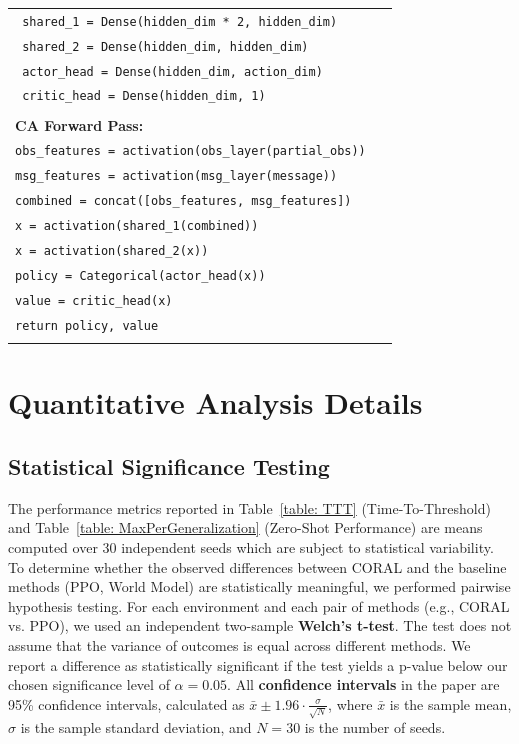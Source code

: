 \documentclass[letterpaper]{article}
\begin{document}
\begin{appendix}
\begin{table}[!htbp]
\begin{tabular}{@{}p{0.95\linewidth}@{}}
\texttt{  shared\_1 = Dense(hidden\_dim * 2, hidden\_dim)} \\
\texttt{  shared\_2 = Dense(hidden\_dim, hidden\_dim)} \\
\texttt{  actor\_head = Dense(hidden\_dim, action\_dim)} \\
\texttt{  critic\_head = Dense(hidden\_dim, 1)} \\
\\
\textbf{CA Forward Pass:} \\
\texttt{obs\_features = activation(obs\_layer(partial\_obs))} \\
\texttt{msg\_features = activation(msg\_layer(message))} \\
\texttt{combined = concat([obs\_features, msg\_features])} \\
\texttt{x = activation(shared\_1(combined))} \\
\texttt{x = activation(shared\_2(x))} \\
\texttt{policy = Categorical(actor\_head(x))} \\
\texttt{value = critic\_head(x)} \\
\texttt{return policy, value} \\
\\
\bottomrule[\heavyrulewidth]
\end{tabular}
\end{table}
\section{Quantitative Analysis Details}
\subsection{Statistical Significance Testing}
\label{subsec:welch_t_test}
The performance metrics reported in Table~\ref{table: TTT} (Time-To-Threshold) and Table~\ref{table: MaxPerGeneralization} (Zero-Shot Performance) are means computed over 30 independent seeds which are subject to statistical variability. To determine whether the observed differences between CORAL and the baseline methods (PPO, World Model) are statistically meaningful, we performed pairwise hypothesis testing. For each environment and each pair of methods (e.g., CORAL vs. PPO), we used an independent two-sample \textbf{Welch's t-test}. The test does not assume that the variance of outcomes is equal across different methods. We report a difference as statistically significant if the test yields a p-value below our chosen significance level of $\alpha=0.05$.
All \textbf{confidence intervals} in the paper are 95\% confidence intervals, calculated as $\bar{x} \pm 1.96 \cdot \frac{\sigma}{\sqrt{N}}$, where $\bar{x}$ is the sample mean, $\sigma$ is the sample standard deviation, and $N=30$ is the number of seeds.

\end{appendix}
\end{document}

